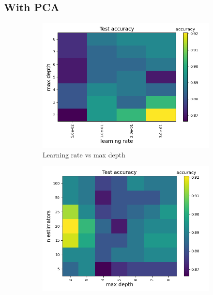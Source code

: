 \documentclass[a4paper]{article}
\begin{document}
\subsection{With PCA}

\begin{figure}[H]
  \centering
  \begin{subfigure}{0.49\textwidth}
    \includegraphics[scale=0.45]{../figures/xgboost/heatmaps/heatmap_nbins200_pca35_seed4155_ts0.20_accuracy_learning_rate_max_depth.png}
    \caption{Learning rate vs max depth}
  \end{subfigure}
  \begin{subfigure}{0.49\textwidth}
    \includegraphics[scale=0.45]{../figures/xgboost/heatmaps/heatmap_nbins200_pca35_seed4155_ts0.20_accuracy_max_depth_n_estimators.png}

\end{subfigure}
\end{figure}
\end{document}
